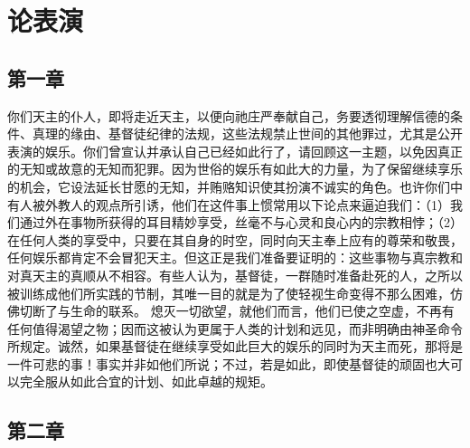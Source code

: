 
\chapter{论表演}



\section{第一章}

你们天主的仆人，即将走近天主，以便向祂庄严奉献自己，务要透彻理解信德的条件、真理的缘由、基督徒纪律的法规，这些法规禁止世间的其他罪过，尤其是公开表演的娱乐。你们曾宣认并承认自己已经如此行了，请回顾这一主题，以免因真正的无知或故意的无知而犯罪。因为世俗的娱乐有如此大的力量，为了保留继续享乐的机会，它设法延长甘愿的无知，并贿赂知识使其扮演不诚实的角色。也许你们中有人被外教人的观点所引诱，他们在这件事上惯常用以下论点来逼迫我们：（1）我们通过外在事物所获得的耳目精妙享受，丝毫不与心灵和良心内的宗教相悖；（2）在任何人类的享受中，只要在其自身的时空，同时向天主奉上应有的尊荣和敬畏，任何娱乐都肯定不会冒犯天主。但这正是我们准备要证明的：这些事物与真宗教和对真天主的真顺从不相容。有些人认为，基督徒，一群随时准备赴死的人，之所以被训练成他们所实践的节制，其唯一目的就是为了使轻视生命变得不那么困难，仿佛切断了与生命的联系。 熄灭一切欲望，就他们而言，他们已使之空虚，不再有任何值得渴望之物；因而这被认为更属于人类的计划和远见，而非明确由神圣命令所规定。诚然，如果基督徒在继续享受如此巨大的娱乐的同时为天主而死，那将是一件可悲的事！事实并非如他们所说；不过，若是如此，即使基督徒的顽固也大可以完全服从如此合宜的计划、如此卓越的规矩。\par


\section{第二章}

